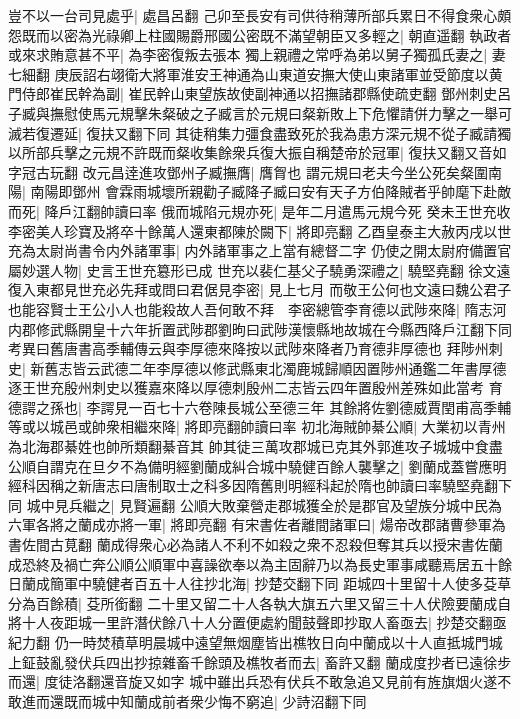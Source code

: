 豈不以一台司見處乎|{
	處昌呂翻}
己卯至長安有司供待稍薄所部兵累日不得食衆心頗怨既而以密為光祿卿上柱國賜爵邢國公密既不滿望朝臣又多輕之|{
	朝直遥翻}
執政者或來求賄意甚不平|{
	為李密復叛去張本}
獨上親禮之常呼為弟以舅子獨孤氏妻之|{
	妻七細翻}
庚辰詔右翊衛大將軍淮安王神通為山東道安撫大使山東諸軍並受節度以黄門侍郎崔民幹為副|{
	崔民幹山東望族故使副神通以招撫諸郡縣使疏吏翻}
鄧州刺史呂子臧與撫慰使馬元規擊朱粲破之子臧言於元規曰粲新敗上下危懼請併力擊之一舉可滅若復遷延|{
	復扶又翻下同}
其徒稍集力彊食盡致死於我為患方深元規不從子臧請獨以所部兵擊之元規不許既而粲收集餘衆兵復大振自稱楚帝於冠軍|{
	復扶又翻又音如字冠古玩翻}
改元昌逹進攻鄧州子臧撫膺|{
	膺胷也}
謂元規曰老夫今坐公死矣粲圍南陽|{
	南陽即鄧州}
會霖雨城壞所親勸子臧降子臧曰安有天子方伯降賊者乎帥麾下赴敵而死|{
	降戶江翻帥讀曰率}
俄而城陷元規亦死|{
	是年二月遣馬元規今死}
癸未王世充收李密美人珍寶及將卒十餘萬人還東都陳於闕下|{
	將即亮翻}
乙酉皇泰主大赦丙戌以世充為太尉尚書令内外諸軍事|{
	内外諸軍事之上當有總督二字}
仍使之開太尉府備置官屬妙選人物|{
	史言王世充簒形已成}
世充以裴仁基父子驍勇深禮之|{
	驍堅堯翻}
徐文遠復入東都見世充必先拜或問曰君倨見李密|{
	見上七月}
而敬王公何也文遠曰魏公君子也能容賢士王公小人也能殺故人吾何敢不拜　李密總管李育德以武陟來降|{
	隋志河内郡修武縣開皇十六年折置武陟郡劉昫曰武陟漢懷縣地故城在今縣西降戶江翻下同　考異曰舊唐書高季輔傳云與李厚德來降按以武陟來降者乃育德非厚德也}
拜陟州刺史|{
	新舊志皆云武德二年李厚德以修武縣東北濁鹿城歸順因置陟州通鑑二年書厚德逐王世充殷州刺史以獲嘉來降以厚德刺殷州二志皆云四年置殷州差殊如此當考}
育德諤之孫也|{
	李諤見一百七十六卷陳長城公至德三年}
其餘將佐劉德威賈閏甫高季輔等或以城邑或帥衆相繼來降|{
	將即亮翻帥讀曰率}
初北海賊帥綦公順|{
	大業初以青州為北海郡綦姓也帥所類翻綦音其}
帥其徒三萬攻郡城已克其外郭進攻子城城中食盡公順自謂克在旦夕不為備明經劉蘭成糾合城中驍健百餘人襲擊之|{
	劉蘭成蓋嘗應明經科因稱之新唐志曰唐制取士之科多因隋舊則明經科起於隋也帥讀曰率驍堅堯翻下同}
城中見兵繼之|{
	見賢遍翻}
公順大敗棄營走郡城獲全於是郡官及望族分城中民為六軍各將之蘭成亦將一軍|{
	將即亮翻}
有宋書佐者離間諸軍曰|{
	煬帝改郡諸曹參軍為書佐間古莧翻}
蘭成得衆心必為諸人不利不如殺之衆不忍殺但奪其兵以授宋書佐蘭成恐終及禍亡奔公順公順軍中喜譟欲奉以為主固辭乃以為長史軍事咸聽焉居五十餘日蘭成簡軍中驍健者百五十人往抄北海|{
	抄楚交翻下同}
距城四十里留十人使多芟草分為百餘積|{
	芟所銜翻}
二十里又留二十人各執大旗五六里又留三十人伏險要蘭成自將十人夜距城一里許潛伏餘八十人分置便處約聞鼓聲即抄取人畜亟去|{
	抄楚交翻亟紀力翻}
仍一時焚積草明晨城中遠望無烟塵皆出樵牧日向中蘭成以十人直抵城門城上鉦鼓亂發伏兵四出抄掠雜畜千餘頭及樵牧者而去|{
	畜許又翻}
蘭成度抄者已遠徐步而還|{
	度徒洛翻還音旋又如字}
城中雖出兵恐有伏兵不敢急追又見前有旌旗烟火遂不敢進而還既而城中知蘭成前者衆少悔不窮追|{
	少詩沼翻下同}
